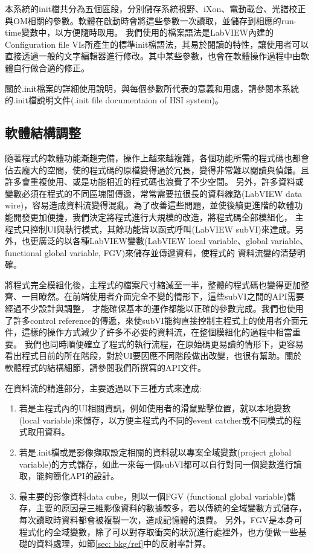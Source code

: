 \documentclass[12pt]{article}
\begin{document}
本系統的init檔共分為五個區段，分別儲存系統視野、iXon、電動載台、光譜校正與OM相關的參數。軟體在啟動時會將這些參數一次讀取，並儲存到相應的run-time變數中，以方便隨時取用。
我們使用的檔案語法是LabVIEW內建的Configuration file VIs所產生的標準init檔語法，其易於閱讀的特性，讓使用者可以直接透過一般的文字編輯器進行修改。其中某些參數，也會在軟體操作過程中由軟體自行做合適的修正。

關於.init檔案的詳細使用說明，與每個參數所代表的意義和用處，請參閱本系統的.init檔說明文件(.init file documentaion of HSI system)。\cite{initDoc}

\subsection{軟體結構調整}
隨著程式的軟體功能漸趨完備，操作上越來越複雜，各個功能所需的程式碼也都會佔去龐大的空間，使的程式碼的原檔變得過於冗長，變得非常難以閱讀與偵錯。且許多會重複使用、或是功能相近的程式碼也浪費了不少空間。
另外，許多資料或變數必須在程式的不同區塊間傳遞，常常需要拉很長的資料線路(LabVIEW data wire)，容易造成資料流變得混亂。為了改善這些問題，並使後續更進階的軟體功能開發更加便捷，我們決定將程式進行大規模的改造，將程式碼全部模組化，
主程式只控制UI與執行模式，其餘功能皆以函式呼叫(LabVIEW subVI)來達成。另外，也更廣泛的以各種LabVIEW變數(LabVIEW local variable、global variable、functional global variable, FGV)來儲存並傳遞資料，使程式的
資料流變的清楚明確。

將程式完全模組化後，主程式的檔案尺寸縮減至一半，整體的程式碼也變得更加整齊、一目瞭然。在前端使用者介面完全不變的情形下，這些subVI之間的API需要經過不少設計與調整，
才能確保基本的運作都能以正確的參數完成。我們也使用了許多control reference的傳遞，來使subVI能夠直接控制主程式上的使用者介面元件，這樣的操作方式減少了許多不必要的資料流，在整個模組化的過程中相當重要。
我們也同時順便確立了程式的執行流程，在原始碼更易讀的情形下，更容易看出程式目前的所在階段，對於UI要因應不同階段做出改變，也很有幫助。關於軟體程式的結構細節，請參閱我們所撰寫的API文件。\cite{apiDoc}

在資料流的精進部分，主要透過以下三種方式來達成:
\begin{enumerate}
    \item 若是主程式內的UI相關資訊，例如使用者的滑鼠點擊位置，就以本地變數(local variable)來儲存，以方便主程式內不同的event catcher或不同模式的程式取用資料。
    \item 若是.init檔或是影像擷取設定相關的資料就以專案全域變數(project global variable)的方式儲存，如此一來每一個subVI都可以自行對同一個變數進行讀取，能夠簡化API的設計。
    \item 最主要的影像資料data cube，則以一個FGV (functional global variable)儲存，主要的原因是三維影像資料的數據較多，若以傳統的全域變數方式儲存，每次讀取時資料都會被複製一次，造成記憶體的浪費。
          另外，FGV是本身可程式化的全域變數，除了可以對存取衝突的狀況進行處裡外，也方便做一些基礎的資料處理，如節\ref{sec: bkg/ref}中的反射率計算。
\end{enumerate}
\end{document}
